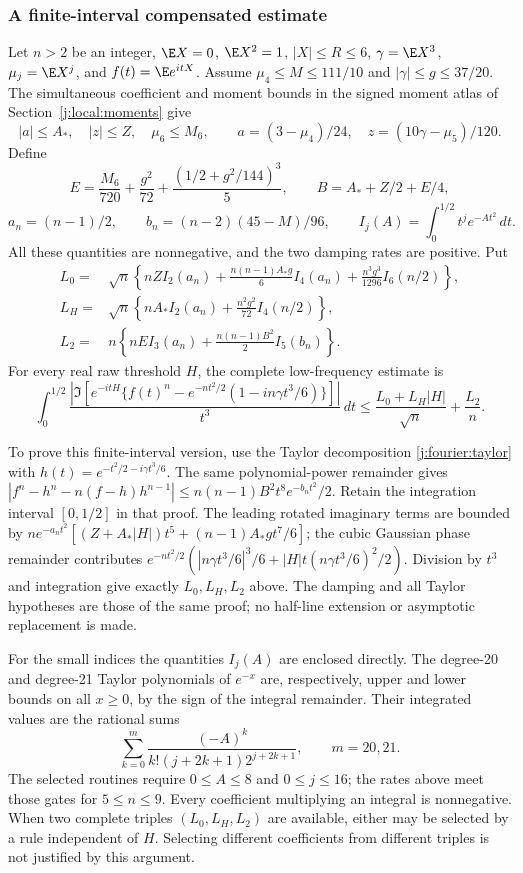 \subsubsection{A finite-interval compensated estimate}
Let $n>2$ be an integer, $\E X=0$, $\E X^2=1$, $|X|\le R\le6$,
$\gamma=\E X^3$, $\mu_j=\E X^j$, and $f(t)=\E e^{itX}$.
Assume $\mu_4\le M\le111/10$ and $|\gamma|\le g\le37/20$.
The simultaneous coefficient and moment bounds in the signed moment atlas
of Section~\ref{j:local:moments} give
\[
 |a|\le A_*,\quad |z|\le Z,\quad \mu_6\le M_6,
 \qquad a=(3-\mu_4)/24,\quad z=(10\gamma-\mu_5)/120.
\]
Define
\[
 E=\frac{M_6}{720}+\frac{g^2}{72}
       +\frac{(1/2+g^2/144)^3}{5},\qquad
 B=A_*+Z/2+E/4,
\]
\[
 a_n=(n-1)/2,\qquad b_n=(n-2)(45-M)/96,\qquad
 I_j(A)=\int_0^{1/2}t^j e^{-At^2}\,dt.
\]
All these quantities are nonnegative, and the two damping rates are
positive. Put
\begin{align*}
 L_0={}&\sqrt n\left\{nZI_2(a_n)
       +\frac{n(n-1)A_*g}{6}I_4(a_n)
       +\frac{n^3g^3}{1296}I_6(n/2)\right\},\\
 L_H={}&\sqrt n\left\{nA_*I_2(a_n)
                              +\frac{n^2g^2}{72}I_4(n/2)\right\},\\
 L_2={}&n\left\{nEI_3(a_n)+\frac{n(n-1)B^2}{2}I_5(b_n)\right\}.
\end{align*}
For every real raw threshold $H$, the complete low-frequency estimate is
\begin{equation}\label{j:finite:finite-low}
 \int_0^{1/2}\frac{\left|\Im\left[e^{-itH}
 \{f(t)^n-e^{-nt^2/2}(1-in\gamma t^3/6)\}\right]\right|}{t^3}\,dt
 \le\frac{L_0+L_H|H|}{\sqrt n}+\frac{L_2}{n}.
\end{equation}

To prove this finite-interval version, use the Taylor decomposition
\eqref{j:fourier:taylor} with $h(t)=e^{-t^2/2-i\gamma t^3/6}$.
The same polynomial-power remainder gives
$|f^n-h^n-n(f-h)h^{n-1}|
\le n(n-1)B^2t^8e^{-b_nt^2}/2$.
Retain the integration interval $[0,1/2]$ in that proof.
The leading rotated imaginary terms are bounded by
$ne^{-a_nt^2}[(Z+A_*|H|)t^5+(n-1)A_*gt^7/6]$;
the cubic Gaussian phase remainder contributes
$e^{-nt^2/2}(|n\gamma t^3/6|^3/6+
|H|t(n\gamma t^3/6)^2/2)$.
Division by $t^3$ and integration give exactly $L_0,L_H,L_2$ above.
The damping and all Taylor hypotheses are those of the same proof;
no half-line extension or asymptotic replacement is made.

For the small indices the quantities $I_j(A)$ are enclosed directly.
The degree-20 and degree-21 Taylor polynomials of $e^{-x}$ are,
respectively, upper and lower bounds on all $x\ge0$, by the sign of
the integral remainder. Their integrated values are the rational sums
\[
 \sum_{k=0}^{m}\frac{(-A)^k}{k!(j+2k+1)2^{j+2k+1}},
 \qquad m=20,21.
\]
The selected routines require $0\le A\le8$ and $0\le j\le16$;
the rates above meet those gates for $5\le n\le9$.
Every coefficient multiplying an integral is nonnegative. When two
complete triples $(L_0,L_H,L_2)$ are available, either may be selected
by a rule independent of $H$. Selecting different coefficients from
different triples is not justified by this argument.

